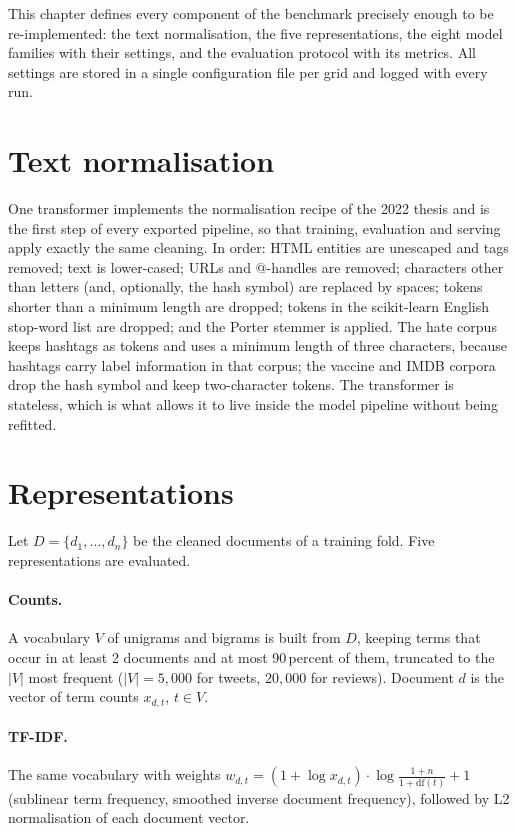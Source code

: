 This chapter defines every component of the benchmark precisely enough to be re-implemented: the text normalisation, the five representations, the eight model families with their settings, and the evaluation protocol with its metrics. All settings are stored in a single configuration file per grid and logged with every run.

\section{Text normalisation}
\label{sec:clean}
One transformer implements the normalisation recipe of the 2022 thesis and is the first step of every exported pipeline, so that training, evaluation and serving apply exactly the same cleaning. In order: HTML entities are unescaped and tags removed; text is lower-cased; URLs and @-handles are removed; characters other than letters (and, optionally, the hash symbol) are replaced by spaces; tokens shorter than a minimum length are dropped; tokens in the scikit-learn English stop-word list are dropped; and the Porter stemmer is applied. The hate corpus keeps hashtags as tokens and uses a minimum length of three characters, because hashtags carry label information in that corpus; the vaccine and IMDB corpora drop the hash symbol and keep two-character tokens. The transformer is stateless, which is what allows it to live inside the model pipeline without being refitted.

\section{Representations}
\label{sec:features}
Let $D = \{d_1, \dots, d_n\}$ be the cleaned documents of a training fold. Five representations are evaluated.

\paragraph{Counts.} A vocabulary $V$ of unigrams and bigrams is built from $D$, keeping terms that occur in at least 2 documents and at most 90\,percent of them, truncated to the $|V|$ most frequent ($|V| = 5{,}000$ for tweets, $20{,}000$ for reviews). Document $d$ is the vector of term counts $x_{d,t}$, $t \in V$.

\paragraph{TF-IDF.} The same vocabulary with weights $w_{d,t} = (1 + \log x_{d,t})\cdot \log\frac{1+n}{1+\mathrm{df}(t)} + 1$ (sublinear term frequency, smoothed inverse document frequency), followed by L2 normalisation of each document vector.

